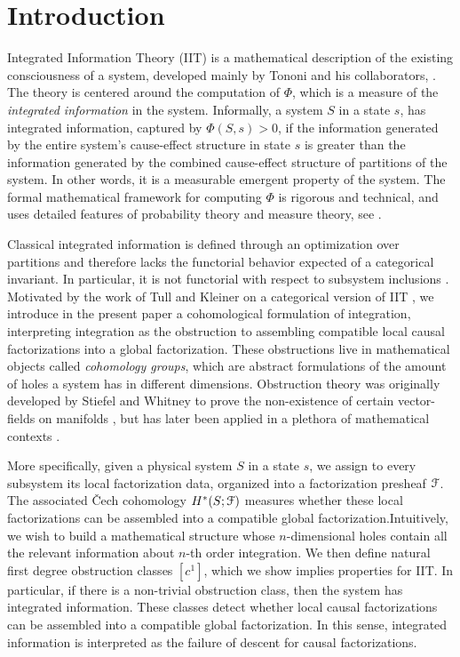 \section{Introduction}

Integrated Information Theory (IIT) is a mathematical description of the existing consciousness of a system, developed mainly by Tononi and his collaborators, \citeme. The theory is centered around the computation of $\Phi$, which is a measure of the \emph{integrated information} in the system. Informally, a system $S$ in a state $s$, has integrated information, captured by $\Phi(S,s)>0$, if the information generated by the entire system's cause-effect structure in state $s$ is greater than the information generated by the combined cause-effect structure of partitions of the system. In other words, it is a measurable  emergent property of the system. The formal mathematical framework for computing $\Phi$ is rigorous and technical, and uses detailed features of probability theory and measure theory, see \citeme.

Classical integrated information is defined through an optimization over partitions and therefore lacks the functorial behavior expected of a categorical invariant. In particular, it is not functorial with respect to subsystem inclusions \citeme. Motivated by the work of Tull and Kleiner on a categorical version of IIT \citeme, we introduce in the present paper a cohomological formulation of integration, interpreting integration as the obstruction to assembling compatible local causal factorizations into a global factorization. These obstructions live in mathematical objects called \emph{cohomology groups}, which are abstract formulations of the amount of holes a system has in different dimensions. Obstruction theory was originally developed by Stiefel and Whitney to prove the non-existence of certain vector-fields on manifolds \citeme, but has later been applied in a plethora of mathematical contexts \citeme. 

More specifically, given a physical system $S$ in a state $s$, we assign to every subsystem its local factorization data, organized into a factorization presheaf $\EuScript{F}$. The associated \v{C}ech cohomology $H^*(S;\EuScript{F})$ measures whether these local factorizations can be assembled into a compatible global factorization.Intuitively, we wish to build a mathematical structure whose $n$-dimensional holes contain all the relevant information about $n$-th order integration. We then define natural first degree obstruction classes $[c^1]$, which we show implies properties for IIT. In particular, if there is a non-trivial obstruction class, then the system has integrated information. These classes detect whether local causal factorizations can be assembled into a compatible global factorization. In this sense, integrated information is interpreted as the failure of descent for causal factorizations.

